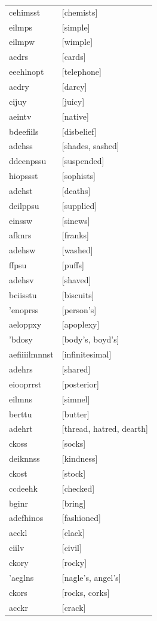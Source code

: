 \documentclass{article}
\begin{document}
\begin{tabular}{ll}
cehimsst & [chemists] \\
eilmps & [simple] \\
eilmpw & [wimple] \\
acdrs & [cards] \\
eeehlnopt & [telephone] \\
acdry & [darcy] \\
cijuy & [juicy] \\
aeintv & [native] \\
bdeefiils & [disbelief] \\
adehss & [shades, sashed] \\
ddeenpssu & [suspended] \\
hiopssst & [sophists] \\
adehst & [deaths] \\
deilppsu & [supplied] \\
einssw & [sinews] \\
afknrs & [franks] \\
adehsw & [washed] \\
ffpsu & [puffs] \\
adehsv & [shaved] \\
bciisstu & [biscuits] \\
'enoprss & [person's] \\
aeloppxy & [apoplexy] \\
'bdosy & [body's, boyd's] \\
aefiiiilmnnst & [infinitesimal] \\
adehrs & [shared] \\
eiooprrst & [posterior] \\
eilmns & [simnel] \\
berttu & [butter] \\
adehrt & [thread, hatred, dearth] \\
ckoss & [socks] \\
deiknnss & [kindness] \\
ckost & [stock] \\
ccdeehk & [checked] \\
bginr & [bring] \\
adefhinos & [fashioned] \\
acckl & [clack] \\
ciilv & [civil] \\
ckory & [rocky] \\
'aeglns & [nagle's, angel's] \\
ckors & [rocks, corks] \\
acckr & [crack] \\

\end{tabular}
\end{document}
